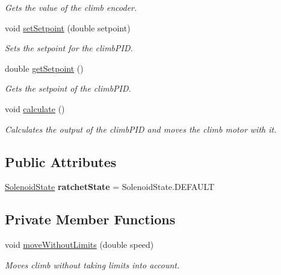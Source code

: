 \begin{DoxyCompactItemize}
\begin{DoxyCompactList}\small\item\em Gets the value of the climb encoder. \end{DoxyCompactList}\item 
void \mbox{\hyperlink{classfrc_1_1robot_1_1subsystems_1_1_climb_ae377d7f0bd8e754506b47d62ebac8b6f}{set\+Setpoint}} (double setpoint)
\begin{DoxyCompactList}\small\item\em Sets the setpoint for the climb\+P\+ID. \end{DoxyCompactList}\item 
double \mbox{\hyperlink{classfrc_1_1robot_1_1subsystems_1_1_climb_a6b0d9b0411f58d97711a9098d5d6f3c1}{get\+Setpoint}} ()
\begin{DoxyCompactList}\small\item\em Gets the setpoint of the climb\+P\+ID. \end{DoxyCompactList}\item 
void \mbox{\hyperlink{classfrc_1_1robot_1_1subsystems_1_1_climb_a2cc8e00444752afdf9c871aa7adeb13a}{calculate}} ()
\begin{DoxyCompactList}\small\item\em Calculates the output of the climb\+P\+ID and moves the climb motor with it. \end{DoxyCompactList}\end{DoxyCompactItemize}
\subsection*{Public Attributes}
\begin{DoxyCompactItemize}
\item 
\mbox{\label{classfrc_1_1robot_1_1subsystems_1_1_climb_a10f08bc6aeb694070ecfb97a81145fa5}} 
\mbox{\hyperlink{enumfrc_1_1robot_1_1enums_1_1_solenoid_state}{Solenoid\+State}} {\bfseries ratchet\+State} = Solenoid\+State.\+D\+E\+F\+A\+U\+LT
\end{DoxyCompactItemize}
\subsection*{Private Member Functions}
\begin{DoxyCompactItemize}
\item 
void \mbox{\hyperlink{classfrc_1_1robot_1_1subsystems_1_1_climb_a2e78533d2e31c4e8cb3e08eb751d3d6f}{move\+Without\+Limits}} (double speed)
\begin{DoxyCompactList}\small\item\em Moves climb without taking limits into account. \end{DoxyCompactList}\end{DoxyCompactItemize}
